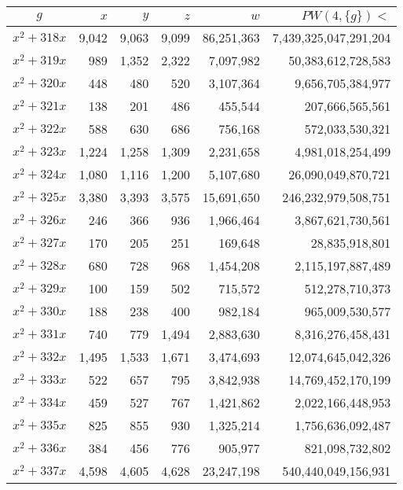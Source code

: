 \documentclass{article}
\begin{document}
\begin{center}
\begin{tabular}{ | c | r | r | r | r | r | }
$g$ & $x$ & $y$ & $z$ & $w$ & $PW(4, \{g\}) <$ \\ \hline
$x^2 + 318x$ & 9{,}042 & 9{,}063 & 9{,}099 & 86{,}251{,}363 & 7{,}439{,}325{,}047{,}291{,}204 \\ \hline
$x^2 + 319x$ & 989 & 1{,}352 & 2{,}322 & 7{,}097{,}982 & 50{,}383{,}612{,}728{,}583 \\ \hline
$x^2 + 320x$ & 448 & 480 & 520 & 3{,}107{,}364 & 9{,}656{,}705{,}384{,}977 \\ \hline
$x^2 + 321x$ & 138 & 201 & 486 & 455{,}544 & 207{,}666{,}565{,}561 \\ \hline
$x^2 + 322x$ & 588 & 630 & 686 & 756{,}168 & 572{,}033{,}530{,}321 \\ \hline
$x^2 + 323x$ & 1{,}224 & 1{,}258 & 1{,}309 & 2{,}231{,}658 & 4{,}981{,}018{,}254{,}499 \\ \hline
$x^2 + 324x$ & 1{,}080 & 1{,}116 & 1{,}200 & 5{,}107{,}680 & 26{,}090{,}049{,}870{,}721 \\ \hline
$x^2 + 325x$ & 3{,}380 & 3{,}393 & 3{,}575 & 15{,}691{,}650 & 246{,}232{,}979{,}508{,}751 \\ \hline
$x^2 + 326x$ & 246 & 366 & 936 & 1{,}966{,}464 & 3{,}867{,}621{,}730{,}561 \\ \hline
$x^2 + 327x$ & 170 & 205 & 251 & 169{,}648 & 28{,}835{,}918{,}801 \\ \hline
$x^2 + 328x$ & 680 & 728 & 968 & 1{,}454{,}208 & 2{,}115{,}197{,}887{,}489 \\ \hline
$x^2 + 329x$ & 100 & 159 & 502 & 715{,}572 & 512{,}278{,}710{,}373 \\ \hline
$x^2 + 330x$ & 188 & 238 & 400 & 982{,}184 & 965{,}009{,}530{,}577 \\ \hline
$x^2 + 331x$ & 740 & 779 & 1{,}494 & 2{,}883{,}630 & 8{,}316{,}276{,}458{,}431 \\ \hline
$x^2 + 332x$ & 1{,}495 & 1{,}533 & 1{,}671 & 3{,}474{,}693 & 12{,}074{,}645{,}042{,}326 \\ \hline
$x^2 + 333x$ & 522 & 657 & 795 & 3{,}842{,}938 & 14{,}769{,}452{,}170{,}199 \\ \hline
$x^2 + 334x$ & 459 & 527 & 767 & 1{,}421{,}862 & 2{,}022{,}166{,}448{,}953 \\ \hline
$x^2 + 335x$ & 825 & 855 & 930 & 1{,}325{,}214 & 1{,}756{,}636{,}092{,}487 \\ \hline
$x^2 + 336x$ & 384 & 456 & 776 & 905{,}977 & 821{,}098{,}732{,}802 \\ \hline
$x^2 + 337x$ & 4{,}598 & 4{,}605 & 4{,}628 & 23{,}247{,}198 & 540{,}440{,}049{,}156{,}931 \\ \hline

\end{tabular}
\end{center}
\end{document}
